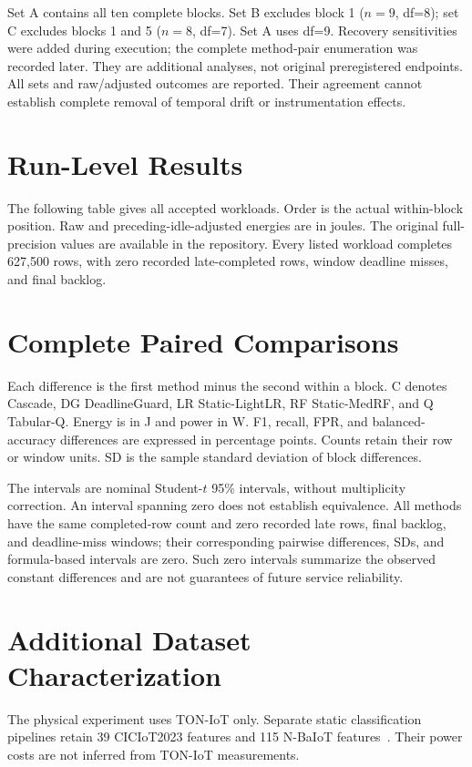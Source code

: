 \documentclass[10pt,a4paper]{article}
\begin{document}
Set A contains all ten complete blocks. Set B excludes block 1 ($n=9$, df=8); set C excludes blocks 1 and 5 ($n=8$, df=7). Set A uses df=9. Recovery sensitivities were added during execution; the complete method-pair enumeration was recorded later. They are additional analyses, not original preregistered endpoints. All sets and raw/adjusted outcomes are reported. Their agreement cannot establish complete removal of temporal drift or instrumentation effects.

\section{Run-Level Results}\label{sec:runs}
The following table gives all accepted workloads. Order is the actual within-block position. Raw and preceding-idle-adjusted energies are in joules. The original full-precision values are available in the repository. Every listed workload completes 627,500 rows, with zero recorded late-completed rows, window deadline misses, and final backlog.


\section{Complete Paired Comparisons}\label{sec:paired}
Each difference is the first method minus the second within a block. C denotes Cascade, DG DeadlineGuard, LR Static-LightLR, RF Static-MedRF, and Q Tabular-Q. Energy is in J and power in W. F1, recall, FPR, and balanced-accuracy differences are expressed in percentage points. Counts retain their row or window units. SD is the sample standard deviation of block differences.

The intervals are nominal Student-$t$ 95\% intervals, without multiplicity correction. An interval spanning zero does not establish equivalence. All methods have the same completed-row count and zero recorded late rows, final backlog, and deadline-miss windows; their corresponding pairwise differences, SDs, and formula-based intervals are zero. Such zero intervals summarize the observed constant differences and are not guarantees of future service reliability.


\section{Additional Dataset Characterization}\label{sec:datasets}
The physical experiment uses TON-IoT only. Separate static classification pipelines retain 39 CICIoT2023 features and 115 N-BaIoT features~\cite{CICSource,NBaIoTSource}. Their power costs are not inferred from TON-IoT measurements.
\end{document}
